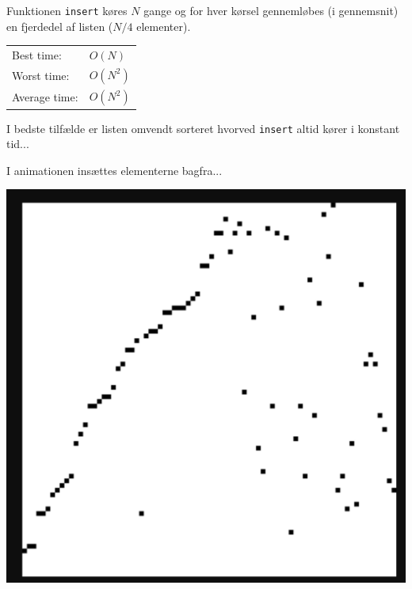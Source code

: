 \documentclass[rgb]{beamer}
\begin{document}
\begin{frame}[fragile]
\begin{footnotesize}

\vspace{1ex}

\begin{minipage}[b]{0.55\textwidth}

  Funktionen \lstinline{insert} køres $N$ gange og for hver kørsel
  gennemløbes (i gennemsnit) en fjerdedel af listen ($N/4$ elementer).

\vspace{1ex}


\vspace{1ex}
  \begin{tabular}{ll}
    Best time: & $O(N)$ \\
    Worst time: & $O(N^2)$ \\
    Average time: & $O(N^2)$
  \end{tabular}

  \vspace{1ex}
  I bedste tilfælde er listen omvendt sorteret hvorved \lstinline{insert} altid kører i konstant tid...

  \vspace{1ex}
  I animationen insættes elementerne bagfra...
  \vfill
\mbox{ }
\end{minipage} \hspace{1cm}
\begin{minipage}[b]{0.3\textwidth}

  \includegraphics[width=\textwidth]{../images/isort_gif.png}


\end{minipage}
\end{footnotesize}
\end{frame}
\end{document}
